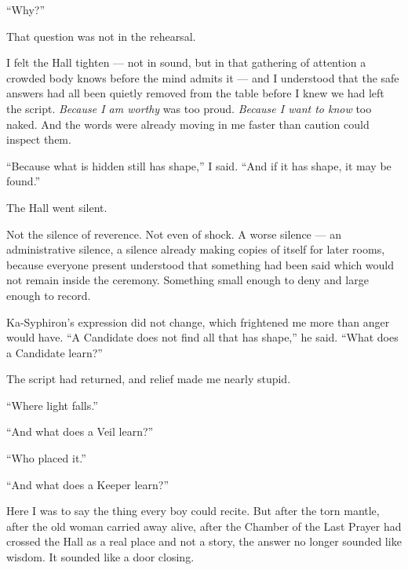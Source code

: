 ``Why?''\par

That question was not in the rehearsal.\par

I felt the Hall tighten --- not in sound, but in that gathering of attention a crowded body knows before the mind admits it --- and I understood that the safe answers had all been quietly removed from the table before I knew we had left the script. \textit{Because I am worthy} was too proud. \textit{Because I want to know} too naked. And the words were already moving in me faster than caution could inspect them.\par

``Because what is hidden still has shape,'' I said. ``And if it has shape, it may be found.''\par

The Hall went silent.\par

Not the silence of reverence. Not even of shock. A worse silence --- an administrative silence, a silence already making copies of itself for later rooms, because everyone present understood that something had been said which would not remain inside the ceremony. Something small enough to deny and large enough to record.\par

Ka-Syphiron's expression did not change, which frightened me more than anger would have. ``A Candidate does not find all that has shape,'' he said. ``What does a Candidate learn?''\par

The script had returned, and relief made me nearly stupid.\par

``Where light falls.''\par

``And what does a Veil learn?''\par

``Who placed it.''\par

``And what does a Keeper learn?''\par

Here I was to say the thing every boy could recite. But after the torn mantle, after the old woman carried away alive, after the Chamber of the Last Prayer had crossed the Hall as a real place and not a story, the answer no longer sounded like wisdom. It sounded like a door closing.\par


